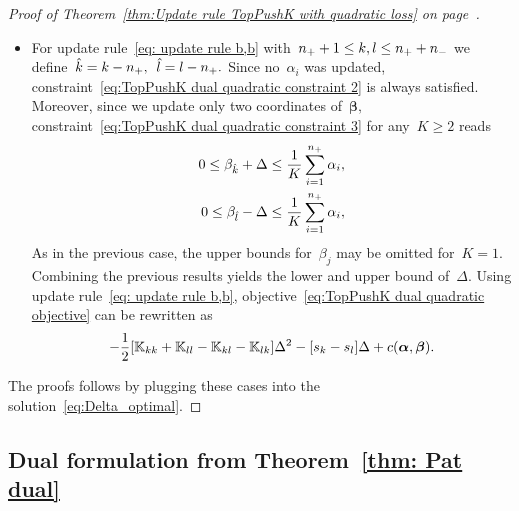\begin{proof}[Proof of Theorem~\ref{thm:Update rule TopPushK with quadratic loss} on page~\pageref{thm:Update rule TopPushK with quadratic loss}]
\begin{itemize}
    \item For update rule~\eqref{eq: update rule b,b} with~$n_{+} + 1\le k,l \le n_{+} + n_{-}$ we define~$\hat{k} = k - n_{+},$~$\hat{l} = l - n_{+}.$ Since no~$\alpha_i$ was updated, constraint~\eqref{eq:TopPushK dual quadratic constraint 2} is always satisfied. Moreover, since we update only two coordinates of~$\bm{\beta},$ constraint~\eqref{eq:TopPushK dual quadratic constraint 3} for any~$K \geq 2$ reads
    \begin{equation}\label{eq: TopPushK dual quadratic b,b - bounds}
      \begin{aligned}
        0 \leq \beta_{\hat{k}} + \Delta \leq \frac{1}{K} \sum_{i = 1}^{n_{+}} \alpha_i, \\
        0 \leq \beta_{\hat{l}} - \Delta \leq \frac{1}{K} \sum_{i = 1}^{n_{+}} \alpha_i,
      \end{aligned}
    \end{equation}
    As in the previous case, the upper bounds for~$\beta_j$ may be omitted for~$K = 1$. Combining the previous results yields the lower and upper bound of~$\Delta.$ Using update rule~\eqref{eq: update rule b,b}, objective~\eqref{eq:TopPushK dual quadratic objective} can be rewritten as
    \begin{equation*}
      - \frac{1}{2} \Brac[s]{\K_{kk} + \K_{ll} - \K_{kl} - \K_{lk}} \Delta^2 - \Brac[s]{s_k - s_l} \Delta + c(\bm{\alpha}, \bm{\beta}).
    \end{equation*}
  \end{itemize}
  The proofs follows by plugging these cases into the solution~\eqref{eq:Delta_optimal}.
\end{proof}

\subsection*{Dual formulation from Theorem~\ref{thm: Pat dual}}

